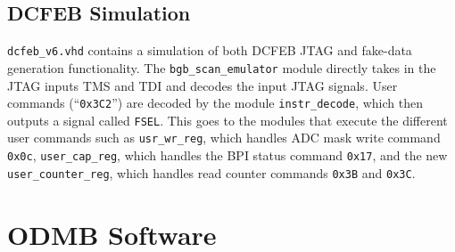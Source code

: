 \documentclass[10pt,a4paper]{article}
\begin{document}
\subsection{DCFEB Simulation}

\texttt{dcfeb\_v6.vhd} contains a simulation of both DCFEB JTAG and fake-data generation functionality. The \texttt{bgb\_scan\_emulator} module directly takes in the JTAG inputs TMS and TDI and decodes the input JTAG signals. User commands (``\texttt{0x3C2}'') are decoded by the module \texttt{instr\_decode}, which then outputs a signal called \texttt{FSEL}. This goes to the modules that execute the different user commands such as \texttt{usr\_wr\_reg}, which handles ADC mask write command \texttt{0x0c}, \texttt{user\_cap\_reg}, which handles the BPI status command \texttt{0x17}, and the new \texttt{user\_counter\_reg}, which handles read counter commands \texttt{0x3B} and \texttt{0x3C}.

\section{ODMB Software}
%
%

%

%
\end{document}
